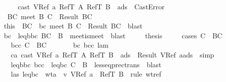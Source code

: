\begin{isabellebody}
\ \ \ \ \ \ \ \ {\isasymor}\ cast\ {\isacharparenleft}VRef\ a{\isacharparenright}\ {\isacharparenleft}RefT\ A{\isacharparenright}\ {\isacharparenleft}RefT\ B{\isacharparenright}\ {\isasymmu}\ ads{}\ {\isacharequal}\ CastError{\isachardoublequoteclose}\isanewline
\ \ \isamarkupfalse \isanewline
\ \ \ \ \isamarkupfalse \ {\isachardoublequoteopen}{\isasymexists}\ BC{\isachardot}\ meet\ B\ C\ {\isacharequal}\ Result\ BC{\isachardoublequoteclose}\isanewline
\ \ \ \ \isamarkupfalse \ this\ \isamarkupfalse \ BC\ \ bc{\isacharcolon}\ {\isachardoublequoteopen}meet\ B\ C\ {\isacharequal}\ Result\ BC{\isachardoublequoteclose}\ \isamarkupfalse \ blast\isanewline
\ \ \ \ \isamarkupfalse \ bc\ \isamarkupfalse \ leq{\isacharunderscore}bbc{\isacharcolon}\ {\isachardoublequoteopen}BC\ {\isasymsqsubseteq}\ B{\isachardoublequoteclose}\ \isamarkupfalse \ meet{\isacharunderscore}is{\isacharunderscore}meet\ \isamarkupfalse \ blast\isanewline
\ \ \ \ \isamarkupfalse \ {\isacharquery}thesis\isanewline
\ \ \ \ \isamarkupfalse \ {\isacharparenleft}cases\ {\isachardoublequoteopen}C\ {\isasymsqsubseteq}\ BC{\isachardoublequoteclose}{\isacharparenright}\isanewline
\ \ \ \ \ \ \isamarkupfalse \ bcc{\isacharcolon}\ {\isachardoublequoteopen}C\ {\isasymsqsubseteq}\ BC{\isachardoublequoteclose}\isanewline
\ \ \ \ \ \ \isamarkupfalse \ bc\ bcc\ lam\isanewline
\ \ \ \ \ \ \isamarkupfalse \ ca{\isacharcolon}\ {\isachardoublequoteopen}cast\ {\isacharparenleft}VRef\ a{\isacharparenright}\ {\isacharparenleft}RefT\ A{\isacharparenright}\ {\isacharparenleft}RefT\ B{\isacharparenright}\ {\isasymmu}\ ads{}\ {\isacharequal}\ Result\ {\isacharparenleft}VRef\ a{\isacharcomma}{\isasymmu}{\isacharcomma}ads{}{\isacharparenright}{\isachardoublequoteclose}\ \isamarkupfalse \ simp\isanewline
\ \ \ \ \ \ \isamarkupfalse \ leq{\isacharunderscore}bbc\ bcc\ \isamarkupfalse \ leq{\isacharunderscore}bc{\isacharcolon}\ {\isachardoublequoteopen}C\ {\isasymsqsubseteq}\ B{\isachardoublequoteclose}\ \isamarkupfalse \ lesseq{\isacharunderscore}prec{\isacharunderscore}trans\ \isamarkupfalse \ blast\isanewline
\ \ \ \ \ \ \isamarkupfalse \ las\ leq{\isacharunderscore}bc\ \isamarkupfalse \ wta{}{\isacharcolon}\ {\isachardoublequoteopen}{\isasymSigma}\ {\isasymturnstile}v\ VRef\ a\ {\isacharcolon}\ RefT\ B{\isachardoublequoteclose}\ \isamarkupfalse \ {\isacharparenleft}rule\ wt{\isacharunderscore}ref{\isacharparenright}\isanewline

\end{isabellebody}
